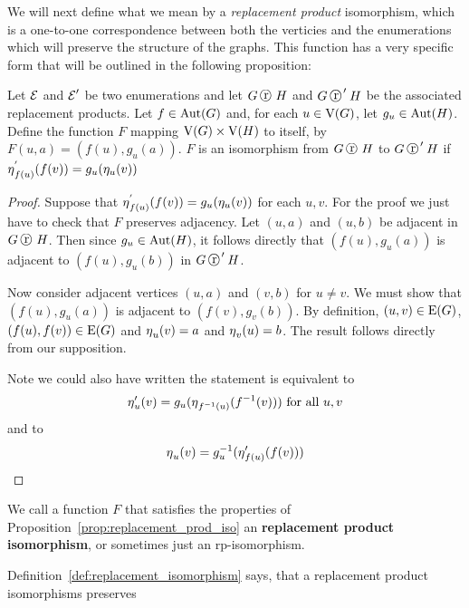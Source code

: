 We will next define what we mean by a {\em replacement product} isomorphism, which is a one-to-one correspondence between both the verticies and the enumerations which will preserve the structure of the graphs. This function has a very specific form that will be outlined in the following proposition:
 
\begin{proposition}
\label{prop:replacement_prod_iso}
Let $\operatorname{\mathcal{E}}$ and $\operatorname{\mathcal{E}}^{\prime}$ be two enumerations and let $G \replacement H$ and $G \replacement^{\prime} H$ be the associated replacement products.  Let $f \in \operatorname{\mathrm{Aut}}(G)$ and, for each $u \in \mathrm{V}(G)$, let $g_u \in \operatorname{\mathrm{Aut}}(H)$. Define the function $F$ mapping $\mathrm{V}(G)\times \mathrm{V}(H)$ to itself, by $F(u,a) = (f(u), g_u(a))$. $F$ is an isomorphism  from $G \replacement H$ to $G \replacement^{\prime} H$ if  $\operatorname{\eta}^{'}_{f(u)}( f(v)) = g_u(\eta_u ( v))$
\end{proposition}
\begin{proof}

Suppose that $\operatorname{\eta}^{'}_{f(u)}( f(v)) = g_u(\eta_u ( v))$ for each $u, v$. For the proof we just have to check that $F$ preserves adjacency. Let $(u,a)$ and $(u,b)$ be adjacent in $G \replacement H$. Then since $g_u \in \operatorname{\mathrm{Aut}}(H)$, it follows directly that $(f(u), g_u(a))$ is adjacent to $(f(u), g_u(b))$ in $G \replacement^{\prime} H$.

Now consider adjacent vertices $(u,a)$ and $(v,b)$ for $u \neq v$.  We must show that $(f(u), g_u(a))$ is adjacent to $(f(v), g_v(b))$. By definition, $(u,v) \in \mathrm{E}(G) $, $(f(u),f(v)) \in \mathrm{E}(G) $ and $\operatorname{\eta}_{u}(v) = a $ and $\operatorname{\eta}_{v}(u) = b$. The result follows directly from our supposition. 

\noindent
Note we could also have written the statement is equivalent to
\[\operatorname{\eta}^{\prime}_u(v) = g_u(\operatorname{\eta}_{f^{-1}(u)} (f^{-1}(v) ))\  \textrm{for all}\  u,v \]
and to
\[ \operatorname{\eta}_u(v) = g_u^{-1}(\operatorname{\eta}^{\prime}_{f(u)}(f(v))) \]
\end{proof}


\begin{definition}
  \label{def:replacement_isomorphism}
We call a function $F$ that satisfies the properties of Proposition~\ref{prop:replacement_prod_iso} an {\bf replacement product isomorphism}, or sometimes just an rp-isomorphism.
\end{definition}

\noindent 
Definition~\ref{def:replacement_isomorphism} says, that a replacement product isomorphisms preserves 

